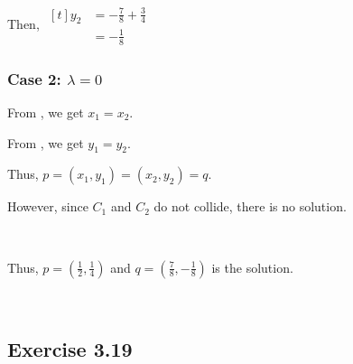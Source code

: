 \documentclass[11pt,fleqn]{book} %
\begin{document}
Then, $\begin{aligned}[t]
    y_2 & = -\frac{7}{8} + \frac{3}{4} \\
        & = -\frac{1}{8}
\end{aligned}$

\subsubsection*{Case 2: $\lambda = 0$}

From , we get $x_1 = x_2$. 

From , we get $y_1 = y_2$. 

Thus, $p = (x_1, y_1) = (x_2, y_2) = q$. 

However, since $C_1$ and $C_2$ do not collide, there is no solution. 

{~~~}

Thus, $p = (\frac{1}{2}, \frac{1}{4})$ and $q = (\frac{7}{8}, -\frac{1}{8})$ is the solution. 

{~~~}

\subsection*{Exercise 3.19}
\end{document}
